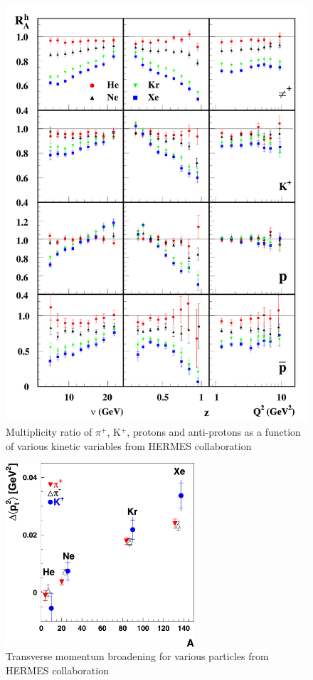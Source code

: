 \begin{figure}[htbp]
\centering
\includegraphics[width=14cm] {fig/Hermes/hermes1.png} 
\caption {Multiplicity ratio of $\pi^+$, K$^+$, protons and anti-protons as a 
function of various kinetic variables from HERMES collaboration \cite{Airapetian:2007vu}}
\label{fig:her2}
\end{figure}

\begin{figure}[htbp]
\centering
\includegraphics[width=7cm] {fig/Hermes/pthermes.png} 
\caption {Transverse momentum broadening for various particles
from HERMES collaboration \cite{Airapetian:2009jy}}
\label{fig:her3}
\end{figure}

